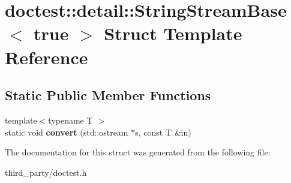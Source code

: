 \hypertarget{structdoctest_1_1detail_1_1_string_stream_base_3_01true_01_4}{}\section{doctest\+::detail\+::String\+Stream\+Base$<$ true $>$ Struct Template Reference}
\label{structdoctest_1_1detail_1_1_string_stream_base_3_01true_01_4}
\subsection*{Static Public Member Functions}
\begin{DoxyCompactItemize}
\item 
\mbox{\label{structdoctest_1_1detail_1_1_string_stream_base_3_01true_01_4_a3f86285d254474498065e6b70522e2b7}} 
{\footnotesize template$<$typename T $>$ }\\static void {\bfseries convert} (std\+::ostream $\ast$s, const T \&in)
\end{DoxyCompactItemize}


The documentation for this struct was generated from the following file\+:\begin{DoxyCompactItemize}
\item 
third\+\_\+party/doctest.\+h\end{DoxyCompactItemize}

